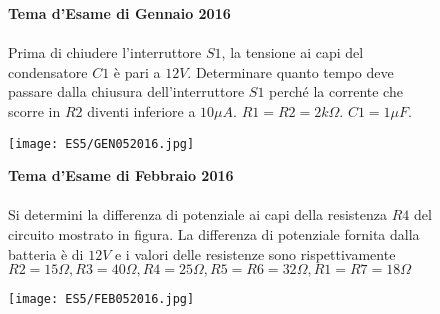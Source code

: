\begin{figure}[h!]
\textbf{Tema d'Esame di Gennaio 2016}\\ \\
 Prima di chiudere l'interruttore $S1$, la tensione ai capi del condensatore $C1$ è pari a $12V$. Determinare quanto tempo deve passare dalla chiusura dell'interruttore $S1$ perché la corrente
che scorre in $R2$ diventi inferiore a $10 \mu A$. $R1=R2=2k\Omega$. $C1=1\mu F$.
	\begin{center}
		\texttt{[image: ES5/GEN052016.jpg]}
	\end{center}
\end{figure}

\begin{figure}[h!]
\textbf{Tema d'Esame di Febbraio 2016}\\ \\
Si determini la differenza di potenziale ai capi della resistenza $R4$ del circuito mostrato in figura. La differenza di potenziale fornita dalla batteria è di $12V$ e i valori delle resistenze sono rispettivamente $R2=15\Omega, R3=40\Omega,R4=25\Omega, R5=R6=32\Omega, R1=R7=18\Omega$
	\begin{center}
		\texttt{[image: ES5/FEB052016.jpg]}
	\end{center}
	\noindent{}	
	
\end{figure}

